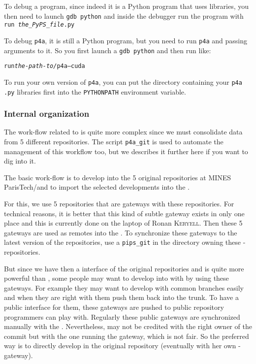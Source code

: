 \documentclass[a4paper]{article}
\begin{document}
To debug a \Apyps program, since indeed it is a Python program that uses
\Apips libraries, you then need to launch \texttt{gdb python} and inside
the debugger run the program with \texttt{run \emph{the\_PyPS\_file}.py}

To debug \texttt{p4a}, it is still a Python program, but you need to run
\texttt{p4a} and passing arguments to it. So you first launch a
\texttt{gdb python} and then run like:
\begin{alltt}
run \emph{the-path-to/}p4a --cuda
\end{alltt}

To run your own version of \texttt{p4a}, you can put the directory
containing your \texttt{p4a} \texttt{.py} libraries first into the
\texttt{PYTHONPATH} environment variable.


\subsubsection{Internal organization}
\label{sec:intern-organ}

The work-flow related to \Apips is quite more complex since we must
consolidate data from 5 different \Asvn repositories. The script
\verb|p4a_git| is used to automate the management of this workflow too,
but we describes it further here if you want to dig into it.

The basic \Apips work-flow is to develop into the 5 original \Apips{}
\Asvn repositories at MINES ParisTech/\Acri and to import the selected
developments into the \Apfa{} \Agit.

For this, we use 5 \Agit repositories that are gateways with these \Asvn
repositories. For technical reasons, it is better that this kind of subtle
gateway exists in only one place and this is currently done on the laptop
of Ronan \textsc{Keryell}. Then these 5 gateways are used as remotes into
the \Apfa{} \Agit. To synchronize these gateways to the latest version of
the \Apips{} \Asvn repositories, use a \verb|pips_git| in the directory
owning these \Agit-\Asvn repositories.

But since we have then a \Agit interface of the original \Apips{} \Asvn
repositories and \Agit is quite more powerful than \Asvn, some people may
want to develop into \Apips with \Agit by using these gateways. For
example they may want to develop with common branches easily and when they
are right with them push them back into the \Apips{} \Asvn trunk. To have
a public interface for them, these \Agit gateways are pushed to public
\Agit repository programmers can play with. Regularly these public
gateways are synchronized manually with the \Apips{} \Asvn. Nevertheless,
\Asvn may not be credited with the right owner of the commit but with the
one running the gateway, which is not fair. So the preferred way is to
directly develop in the original \Apips \Asvn repository (eventually with
her own \Agit-\Asvn gateway).
\end{document}
